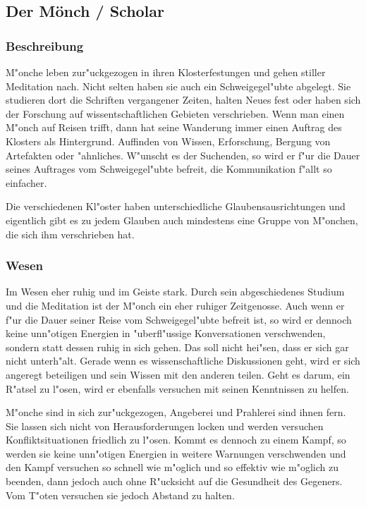 \subsection{Der Mönch / Scholar}
\subsubsection{Beschreibung}
\par M"onche leben zur"uckgezogen in ihren Klosterfestungen und gehen stiller Meditation nach. Nicht selten haben sie auch ein Schweigegel"ubte abgelegt. Sie studieren dort die Schriften vergangener Zeiten, halten Neues fest oder haben sich der Forschung auf wissentschaftlichen Gebieten verschrieben.
Wenn man einen M"onch auf Reisen trifft, dann hat seine Wanderung immer einen Auftrag des Klosters als Hintergrund. Auffinden von Wissen, Erforschung, Bergung von Artefakten oder "ahnliches. W"unscht es der Suchenden, so wird er f"ur die Dauer seines Auftrages vom Schweigegel"ubte befreit, die Kommunikation f"allt so einfacher.
\par Die verschiedenen Kl"oster haben unterschiedliche Glaubensausrichtungen und eigentlich gibt es zu jedem Glauben auch mindestens eine Gruppe von M"onchen, die sich ihm verschrieben hat.
\subsubsection{Wesen}
\par Im Wesen eher ruhig und im Geiste stark. Durch sein abgeschiedenes Studium und die Meditation ist der M"onch ein eher ruhiger Zeitgenosse. Auch wenn er f"ur die Dauer seiner Reise vom Schweigegel"ubte befreit ist, so wird er dennoch keine unn"otigen Energien in "uberfl"ussige Konversationen verschwenden, sondern statt dessen ruhig in sich gehen. Das soll nicht hei"sen, dass er sich gar nicht unterh"alt. Gerade wenn es wissenschaftliche Diskussionen geht, wird er sich angeregt beteiligen und sein Wissen mit den anderen teilen. Geht es darum, ein R"atsel zu l"osen, wird er ebenfalls versuchen mit seinen Kenntnissen zu helfen.
\par M"onche sind in sich zur"uckgezogen, Angeberei und Prahlerei sind ihnen fern. Sie lassen sich nicht von Herausforderungen locken und werden versuchen Konfliktsituationen friedlich zu l"osen. Kommt es dennoch zu einem Kampf, so werden sie keine unn"otigen Energien in weitere Warnungen verschwenden und den Kampf versuchen so schnell wie m"oglich und so effektiv wie m"oglich zu beenden, dann jedoch auch ohne R"ucksicht auf die Gesundheit des Gegeners. Vom T"oten versuchen sie jedoch Abstand zu halten.
